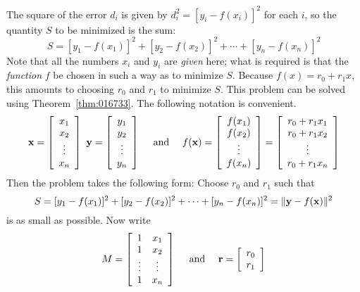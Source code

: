 The square of the error $d_i$ is given by $ d_i^2 = [y_i - f(x_i)]^2 $ for each $i$, so the quantity $S$ to be minimized is the sum:
\begin{equation*}
S = [y_1 - f(x_1)]^2 + [y_2 - f(x_2)]^2 + \dotsb + [y_n - f(x_n)]^2
\end{equation*}
Note that all the numbers $x_{i}$ and $y_{i}$ are \textit{given} here; what is required is that the \textit{function} $f$ be chosen in such a way as to minimize $S$. Because $f(x) = r_{0} + r_{1}x$, this amounts to choosing $r_{0}$ and $r_{1}$ to minimize $S$. This problem can be solved using Theorem~\ref{thm:016733}. The following notation is convenient.
\begin{equation*}
\textbf{x} = 
\left[ \begin{array}{c}
x_1 \\
x_2 \\
\vdots \\
x_n
\end{array} \right]
\ \textbf{y} = 
\left[ \begin{array}{c}
y_1 \\
y_2 \\
\vdots \\
y_n
\end{array} \right]
\quad \mbox{ and } \quad f(\textbf{x}) = 
\left[ \begin{array}{c}
f(x_1) \\
f(x_2) \\
\vdots \\
f(x_n)
\end{array} \right]
= \left[ \begin{array}{c}
r_0 + r_1x_1 \\
r_0 + r_1x_2 \\
\vdots \\
r_0 + r_1x_n \\
\end{array} \right]
\end{equation*}
Then the problem takes the following form: Choose $r_{0}$ and $r_{1}$ such that
\begin{equation*}
S = [y_1 - f(x_1)]^2 + [y_2 - f(x_2)]^2 + \dotsb + [y_n - f(x_n)]^2 = \| \textbf{y} - f(\textbf{x}) \| ^2
\end{equation*}
is as small as possible. Now write
\begin{equation*}
M = 
\left[ \begin{array}{cc}
1 & x_1 \\
1 & x_2 \\
\vdots & \vdots \\
1 & x_n
\end{array} \right]
\quad \mbox{ and } \quad \textbf{r} = 
\left[ \begin{array}{r}
r_0 \\
r_1
\end{array} \right]
\end{equation*}
